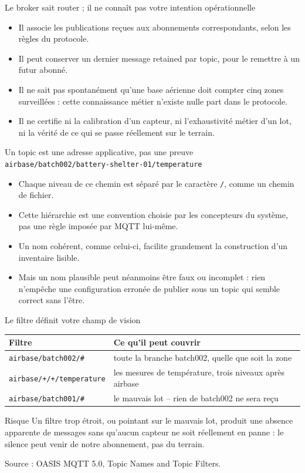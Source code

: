 \documentclass[aspectratio=169]{beamer}
\newcommand{\sourcefoot}[1]{\vfill\tiny\color{gray}Source : #1}
\begin{document}
\begin{frame}{Le broker sait router ; il ne connaît pas votre intention opérationnelle}
\begin{itemize}
\item Il associe les publications reçues aux abonnements correspondants, selon les règles du protocole.
\item Il peut conserver un dernier message retained par topic, pour le remettre à un futur abonné.
\item Il ne sait pas spontanément qu'une base aérienne doit compter cinq zones surveillées : cette connaissance métier n'existe nulle part dans le protocole.
\item Il ne certifie ni la calibration d'un capteur, ni l'exhaustivité métier d'un lot, ni la vérité de ce qui se passe réellement sur le terrain.
\end{itemize}
\end{frame}

\begin{frame}{Un topic est une adresse applicative, pas une preuve}
\small\texttt{airbase/batch002/battery-shelter-01/temperature}
\begin{itemize}
\item Chaque niveau de ce chemin est séparé par le caractère \texttt{/}, comme un chemin de fichier.
\item Cette hiérarchie est une convention choisie par les concepteurs du système, pas une règle imposée par MQTT lui-même.
\item Un nom cohérent, comme celui-ci, facilite grandement la construction d'un inventaire lisible.
\item Mais un nom plausible peut néanmoins être faux ou incomplet : rien n'empêche une configuration erronée de publier sous un topic qui semble correct sans l'être.
\end{itemize}
\end{frame}

\begin{frame}{Le filtre définit votre champ de vision}
\begin{tabular}{@{}p{}p{}@{}}
\toprule
Filtre & Ce qu'il peut couvrir \\
\midrule
\texttt{airbase/batch002/\#} & toute la branche batch002, quelle que soit la zone \\[2pt]
\texttt{airbase/+/+/temperature} & les mesures de température, trois niveaux après airbase \\[2pt]
\texttt{airbase/batch001/\#} & le mauvais lot -- rien de batch002 ne sera reçu \\
\bottomrule
\end{tabular}
\begin{alertblock}{Risque}
Un filtre trop étroit, ou pointant sur le mauvais lot, produit une absence apparente de messages sans qu'aucun capteur ne soit réellement en panne : le silence peut venir de notre abonnement, pas du terrain.
\end{alertblock}
\sourcefoot{OASIS MQTT 5.0, Topic Names and Topic Filters.}
\end{frame}
\end{document}
